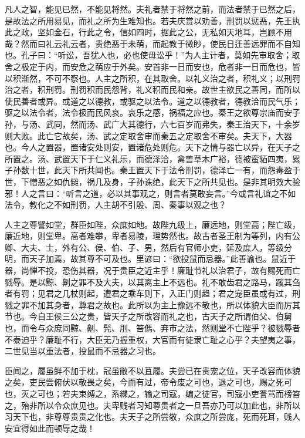 \documentclass[]{article}
\begin{document}
凡人之智，能见已然，不能见将然。夫礼者禁于将然之前，而法者禁于已然之后，是故法之所用易见，而礼之所为生难知也。若夫庆赏以劝善，刑罚以惩恶，先王执此之政，坚如金石，行此之令，信如四时，据此之公，无私如天地耳，岂顾不用哉？然而曰礼云礼云者，贵绝恶于未萌，而起教于微眇，使民日迁善远罪而不自知也。孔子曰：``听讼，吾犹人也，必也使毋讼乎！''为人主计者，莫如先审取舍；取舍之极定于内，而安危之萌应于外矣。安首非一日而安也，危者非一日而危也，皆以积渐然，不可不察也。人主之所积，在其取舍。以礼义治之者，积礼义；以刑罚治之者，积刑罚。刑罚积而民怨背，礼义积而民和亲。故世主欲民之善同，而所以使民善者或异。或道之以德教，或驱之以法令。道之以德教者，德教洽而民气乐；驱之以法令者，法令极而民风哀。哀乐之感，祸福之应也。秦王之欲尊宗庙而安子孙，与汤、武同，然而汤、武广大其德行，六七百岁而弗失，秦王治天下，十余岁则大败。此亡它故矣，汤、武之定取舍审而秦五之定取舍不审矣。夫天下，大器也。今人之置器，置诸安处则安，置诸危处则危。天下之情与器亡以异，在天子之所置之。汤、武置天下于仁义礼乐，而德泽洽，禽兽草木广裕，德被蛮貊四夷，累子孙数十世，此天下所共闻也。秦王置天下于法令刑罚，德泽亡一有，而怨毒盈于世，下憎恶之如仇雠，祸几及身，子孙诛绝，此天下之所共见也。是非其明效大验邪！人之言曰：``听言之道，必以其事观之，则言者莫敢妄言。''今或言礼谊之不如法令，教化之不如刑罚，人主胡不引殷、周、秦事以观之也？

人主之尊譬如堂，群臣如陛，众庶如地。故陛九级上，廉远地，则堂高；陛亡级，廉近地，则堂卑。高者难攀，卑者易陵，理势然也。故古者圣王制为等列，内有公卿、大夫、士，外有公、侯、伯、子、男，然后有官师小吏，延及庶人，等级分明，而天子加焉，故其尊不可及也。里谚曰：``欲投鼠而忌器。''此善谕也。鼠近于器，尚惮不投，恐伤其器，况于贵臣之近主乎！廉耻节礼以治君子，故有赐死而亡戮辱。是以黥、劓之罪不及大夫，以其离主上不远也。礼不敢齿君之路马，蹴其刍者有罚；见君之几杖则起，遭君之乘车则下，入正门则趋；君之宠臣虽或有过，刑戮之罪不加其身者，尊君之故也。此所以为主上豫远不敬也，所以体貌大臣而厉其节也。今自王侯三公之贵，皆天子之所改容而礼之也，古天子之所谓伯父、伯舅也，而令与众庶同黥、劓、髡、刖、笞傌、弃市之法，然则堂不亡陛乎？被戮辱者不泰迫乎？廉耻不行，大臣无乃握重权，大官而有徒隶亡耻之心乎？夫望夷之事，二世见当以重法者，投鼠而不忌器之习也。

臣闻之，履虽鲜不加于枕，冠虽敝不以苴履。夫尝已在贵宠之位，天子改容而体貌之矣，吏民尝俯伏以敬畏之矣，今而有过，帝令废之可也，退之可也，赐之死可也，灭之可也；若夫束缚之，系緤之，输之司寇，编之徒官，司寇小吏詈骂而榜笞之，殆非所以令众庶见也。夫卑贱者习知尊贵者之一旦吾亦乃可以加此也，非所以习天下也，非尊尊贵贵之化也。夫天子之所尝敬，众庶之所尝庞，死而死耳，贱人安宜得如此而顿辱之哉！
\end{document}
